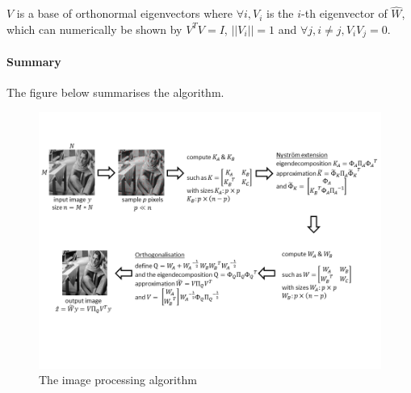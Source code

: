 \(V\) is a base of orthonormal eigenvectors where \(\forall i, V_i\) is the \(i\)-th eigenvector of \(\hat{W}\), which can numerically be shown by \(V^T V = I\), \(||V_i|| = 1\) and \(\forall j, i \neq j, V_i V_j = 0\).

\paragraph{Summary}

The figure below summarises the algorithm.

\begin{figure}[H]
    \centering
    \includegraphics[width=1.2\textwidth]{img/processingChain.png}
    \caption{The image processing algorithm}
\end{figure}

